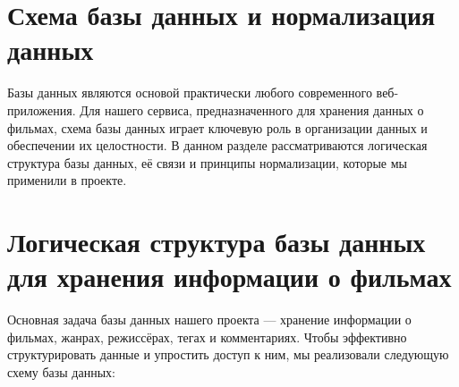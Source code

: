 \section{Схема базы данных и нормализация данных}
Базы данных являются основой практически любого современного веб-приложения. Для нашего сервиса, предназначенного для хранения данных о фильмах, схема базы данных играет ключевую роль в организации данных и обеспечении их целостности. В данном разделе рассматриваются логическая структура базы данных, её связи и принципы нормализации, которые мы применили в проекте.

\section{Логическая структура базы данных для хранения информации о фильмах}
Основная задача базы данных нашего проекта — хранение информации о фильмах, жанрах, режиссёрах, тегах и комментариях. Чтобы эффективно структурировать данные и упростить доступ к ним, мы реализовали следующую схему базы данных:
